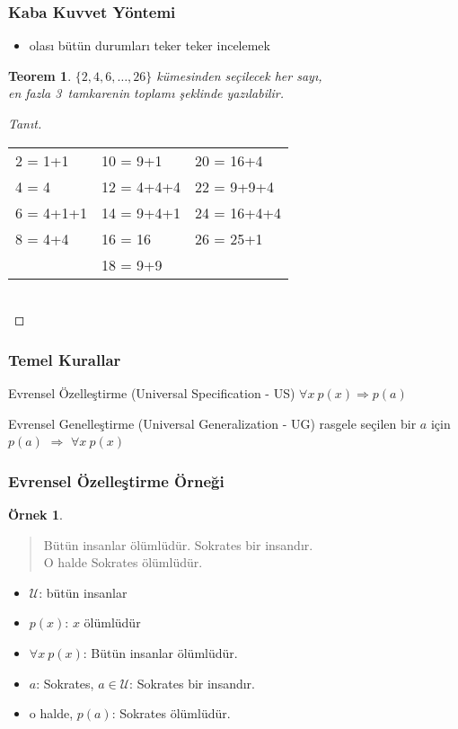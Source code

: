 \documentclass[dvipsnames]{beamer}
\theoremstyle{definition}
\theoremstyle{example}
\newtheorem{ornek}[theorem]{Örnek}
\theoremstyle{plain}
\newtheorem{teorem}[theorem]{Teorem}
\begin{document}
\begin{frame}
  \frametitle{Kaba Kuvvet Yöntemi}

  \begin{itemize}
    \item olası bütün durumları teker teker incelemek
  \end{itemize}

  \pause
  \begin{teorem}
    $\{2,4,6,\dots,26\}$ kümesinden seçilecek her sayı,\\
    en fazla 3~tamkarenin toplamı şeklinde yazılabilir.
  \end{teorem}

  \pause
  \begin{proof}[Tanıt]
    \begin{tabular}{lll}
      2 = 1+1   & 10 = 9+1    & 20 = 16+4\\
      4 = 4     & 12 = 4+4+4  & 22 = 9+9+4\\
      6 = 4+1+1 & 14 = 9+4+1  & 24 = 16+4+4\\
      8 = 4+4   & 16 = 16     & 26 = 25+1\\
                & 18 = 9+9    &
    \end{tabular}\\
  \end{proof}
\end{frame}

\begin{frame}
  \frametitle{Temel Kurallar}

  \begin{block}{Evrensel Özelleştirme (Universal Specification - US)}
    $\forall x~p(x) \Rightarrow p(a)$
  \end{block}

  \pause
  \begin{block}{Evrensel Genelleştirme (Universal Generalization - UG)}
    \alert{rasgele seçilen} bir $a$ için $p(a)$
    $\Rightarrow$ $\forall x~p(x)$
  \end{block}
\end{frame}

\begin{frame}
  \frametitle{Evrensel Özelleştirme Örneği}

  \begin{ornek}
    \begin{quote}
      Bütün insanlar ölümlüdür. Sokrates bir insandır.\\
      O halde Sokrates ölümlüdür.
    \end{quote}

    \pause
    \begin{itemize}
      \item $\mathcal{U}$: bütün insanlar
      \item $p(x)$: $x$ ölümlüdür
      \item $\forall x~p(x)$: Bütün insanlar ölümlüdür.
      \item $a$: Sokrates, $a \in \mathcal{U}$: Sokrates bir insandır.
      \item o halde, $p(a)$: Sokrates ölümlüdür.
    \end{itemize}
  \end{ornek}
\end{frame}
\end{document}

